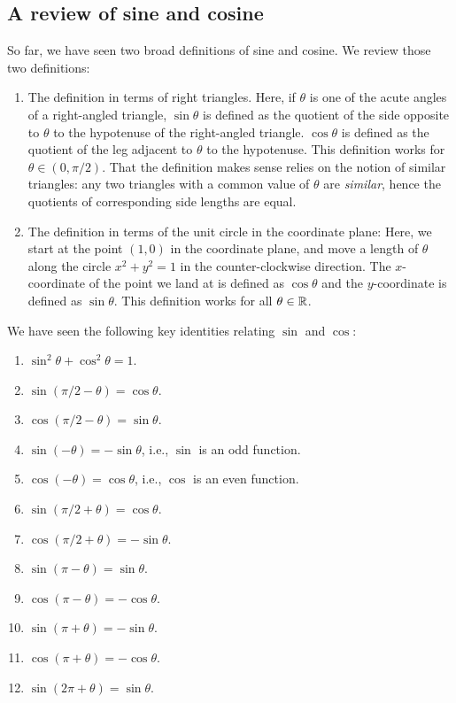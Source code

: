 \documentclass{amsart}
\begin{document}
\subsection{A review of sine and cosine}

So far, we have seen two broad definitions of sine and cosine. We
review those two definitions:

\begin{enumerate}
\item The definition in terms of right triangles. Here, if $\theta$ is
  one of the acute angles of a right-angled triangle, $\sin \theta$ is
  defined as the quotient of the side opposite to $\theta$ to the
  hypotenuse of the right-angled triangle. $\cos \theta$ is defined as
  the quotient of the leg adjacent to $\theta$ to the hypotenuse. This
  definition works for $\theta \in (0,\pi/2)$. That the definition
  makes sense relies on the notion of similar triangles: any two
  triangles with a common value of $\theta$ are {\em similar}, hence
  the quotients of corresponding side lengths are equal.
\item The definition in terms of the unit circle in the coordinate
  plane: Here, we start at the point $(1,0)$ in the coordinate plane,
  and move a length of $\theta$ along the circle $x^2 + y^2 = 1$ in
  the counter-clockwise direction. The $x$-coordinate of the point we
  land at is defined as $\cos \theta$ and the $y$-coordinate is
  defined as $\sin \theta$. This definition works for all $\theta \in
  \mathbb{R}$.
\end{enumerate}

We have seen the following key identities relating $\sin$ and $\cos$:

\begin{enumerate}
\item $\sin^2 \theta + \cos^2 \theta = 1$.
\item $\sin(\pi/2 - \theta) = \cos \theta$.
\item $\cos(\pi/2 - \theta) = \sin \theta$.
\item $\sin(-\theta) = - \sin \theta$, i.e., $\sin$ is an odd function.
\item $\cos(-\theta) = \cos \theta$, i.e., $\cos$ is an even function.
\item $\sin(\pi/2 + \theta) = \cos \theta$.
\item $\cos(\pi/2 + \theta) = -\sin \theta$.
\item $\sin(\pi - \theta) = \sin \theta$.
\item $\cos(\pi - \theta) = -\cos \theta$.
\item $\sin(\pi + \theta) = - \sin \theta$.
\item $\cos(\pi + \theta) = - \cos \theta$.
\item $\sin(2\pi + \theta) = \sin \theta$.
\end{enumerate}
\end{document}
